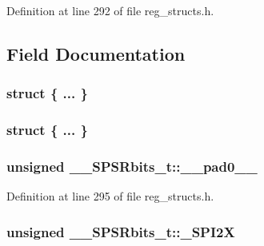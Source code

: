 Definition at line 292 of file reg\+\_\+structs.\+h.



\subsection{Field Documentation}
\hypertarget{union_____s_p_s_rbits__t_aaa86055d7c5d2604aedefe15e48d77cd}{\subsubsection[{"@69}]{\setlength{\rightskip}{0pt plus 5cm}struct \{ ... \} }}\label{union_____s_p_s_rbits__t_aaa86055d7c5d2604aedefe15e48d77cd}
\hypertarget{union_____s_p_s_rbits__t_aa658ee97193e5787e9f4687dde3c5eac}{\subsubsection[{"@71}]{\setlength{\rightskip}{0pt plus 5cm}struct \{ ... \} }}\label{union_____s_p_s_rbits__t_aa658ee97193e5787e9f4687dde3c5eac}
\hypertarget{union_____s_p_s_rbits__t_a88a39481148a220348dc582e83a5799c}{
\subsubsection[{\+\_\+\+\_\+pad0\+\_\+\+\_\+}]{\setlength{\rightskip}{0pt plus 5cm}unsigned \+\_\+\+\_\+\+S\+P\+S\+Rbits\+\_\+t\+::\+\_\+\+\_\+pad0\+\_\+\+\_\+}}\label{union_____s_p_s_rbits__t_a88a39481148a220348dc582e83a5799c}


Definition at line 295 of file reg\+\_\+structs.\+h.

\hypertarget{union_____s_p_s_rbits__t_adf8c5ae0c13376fefe8ea84bb2a8cc3d}{
\subsubsection[{\+\_\+\+S\+P\+I2\+X}]{\setlength{\rightskip}{0pt plus 5cm}unsigned \+\_\+\+\_\+\+S\+P\+S\+Rbits\+\_\+t\+::\+\_\+\+S\+P\+I2\+X}}\label{union_____s_p_s_rbits__t_adf8c5ae0c13376fefe8ea84bb2a8cc3d}


